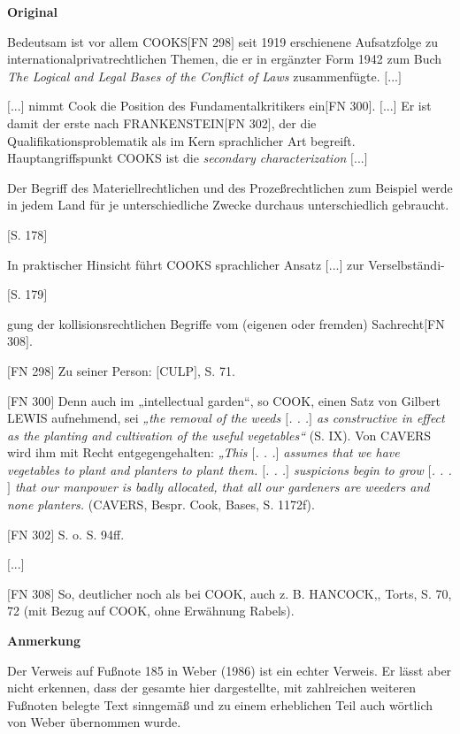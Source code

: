 \documentclass[ngerman,final,fontsize=12pt,paper=a4,twoside,bibliography=totocnumbered,BCOR=8mm,draft=false]{scrartcl}
\newenvironment{fragment}
	{\begin{snugshade}}
	{\end{snugshade}
	 \penalty-200
	 \vskip 0pt plus 10mm minus 5mm}
\newenvironment{fragmentpart}[1]
	{\noindent\textbf{#1}\par\penalty500}
	{\par}
\begin{document}
\begin{fragment}
\begin{fragmentpart}{Original \cite[S.~177--179 Z.~10--15,~19--20,~34--36,~1--2]{Weber-1986}}
{Bedeutsam ist vor allem COOKS$[$FN 298$]$ seit 1919 erschienene Aufsatzfolge zu internationalprivatrechtlichen Themen, die er in ergänzter Form 1942 zum Buch \textsl{The Logical and Legal Bases of the Conflict of Laws} zusammenfügte. $[$...$]$

$[$...$]$ nimmt Cook die Position des Fundamentalkritikers ein$[$FN 300$]$. $[$...$]$ Er ist damit der erste nach FRANKENSTEIN$[$FN 302$]$, der die Qualifikationsproblematik als im Kern sprachlicher Art begreift. Hauptangriffspunkt COOKS ist die \textsl{secondary characterization} $[$...$]$

Der Begriff des Materiellrechtlichen und des Prozeßrechtlichen zum Beispiel werde in jedem Land für je unterschiedliche Zwecke durchaus unterschiedlich gebraucht.

$[$S. 178$]$

In praktischer Hinsicht führt COOKS sprachlicher Ansatz $[$...$]$ zur Verselbständi-

$[$S. 179$]$

gung der kollisionsrechtlichen Begriffe vom (eigenen oder fremden) Sachrecht$[$FN 308$]$.


$[$FN 298$]$ Zu seiner Person: $[$CULP$]$, S. 71.

$[$FN 300$]$ Denn auch im „intellectual garden“, so COOK, einen Satz von Gilbert LEWIS aufnehmend, sei \textsl{„the removal of the weeds $[$. . .$]$ as constructive in effect as the planting and cultivation of the useful vegetables“} (S. IX). Von CAVERS wird ihm mit Recht entgegengehalten: \textsl{„This $[$. . .$]$ assumes that we have vegetables to plant and planters to plant them. $[$. . .$]$ suspicions begin to grow $[$. . .$]$ that our manpower is badly allocated, that all our gardeners are weeders and none planters.\textquotedbl{}} (CAVERS, Bespr. Cook, Bases, S. 1172f).

$[$FN 302$]$ S. o. S. 94ff.

$[$...$]$

$[$FN 308$]$ So, deutlicher noch als bei COOK, auch z. B. HANCOCK,, Torts, S. 70, 72 (mit Bezug auf COOK, ohne Erwähnung Rabels).}
\end{fragmentpart}
\begin{fragmentpart}{Anmerkung}
Der Verweis auf Fußnote 185 in Weber (1986) ist ein echter Verweis. Er lässt aber nicht erkennen, dass der gesamte hier dargestellte, mit zahlreichen weiteren Fußnoten belegte Text sinngemäß und zu einem erheblichen Teil auch wörtlich von Weber übernommen wurde.
\end{fragmentpart}
\end{fragment}
\end{document}
